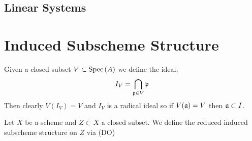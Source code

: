 \documentclass[12pt]{article}
\begin{document}
\subsection{Linear Systems}

\section{Induced Subscheme Structure}

\begin{definition}
Given a closed subset $V \subset \mathrm{Spec}\left( A \right)$ we define the ideal,
\[ I_V = \bigcap_{\mathfrak{p} \in V} \mathfrak{p} \]
Then clearly $V(I_V) = V$ and $I_V$ is a radical ideal so if $V(\mathfrak{a}) = V$ then $\mathfrak{a} \subset I$.  
\end{definition}

\begin{definition}
Let $X$ be a scheme and $Z \subset X$ a closed subset. We define the reduced induced subscheme structure on $Z$ via (DO)
\end{definition}
\end{document}
